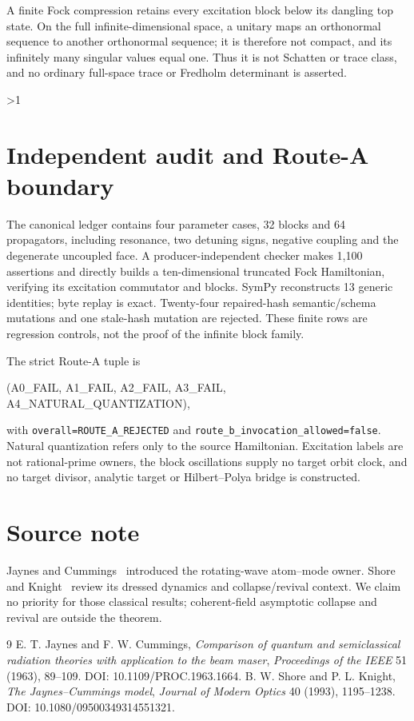 \documentclass[11pt]{article}
\begin{document}
A finite Fock compression retains every excitation block below its dangling
top state.  On the full infinite-dimensional space, a unitary maps an
orthonormal sequence to another orthonormal sequence; it is therefore not
compact, and its infinitely many singular values equal one.  Thus it is not
Schatten or trace class, and no ordinary full-space trace or Fredholm
determinant is asserted.
\fi

\ifnum\CRevisionRound>1
\section{Independent audit and Route-A boundary}
The canonical ledger contains four parameter cases, 32 blocks and 64
propagators, including resonance, two detuning signs, negative coupling and
the degenerate uncoupled face.  A producer-independent checker makes 1,100
assertions and directly builds a ten-dimensional truncated Fock Hamiltonian,
verifying its excitation commutator and blocks.  SymPy reconstructs 13 generic
identities; byte replay is exact.  Twenty-four repaired-hash semantic/schema
mutations and one stale-hash mutation are rejected.  These finite rows are
regression controls, not the proof of the infinite block family.

The strict Route-A tuple is
\begin{center}\ttfamily
(A0\_FAIL, A1\_FAIL, A2\_FAIL, A3\_FAIL,
A4\_NATURAL\_QUANTIZATION),
\end{center}
with \texttt{overall=ROUTE\_A\_REJECTED} and
\texttt{route\_b\_invocation\_allowed=false}.  Natural quantization refers
only to the source Hamiltonian.  Excitation labels are not rational-prime
owners, the block oscillations supply no target orbit clock, and no target
divisor, analytic target or Hilbert--Polya bridge is constructed.
\fi

\section*{Source note}
Jaynes and Cummings~\cite{jc1963} introduced the rotating-wave atom--mode
owner.  Shore and Knight~\cite{sk1993} review its dressed dynamics and
collapse/revival context.  We claim no priority for those classical results;
coherent-field asymptotic collapse and revival are outside the theorem.

\begin{thebibliography}{9}
 E. T. Jaynes and F. W. Cummings, \textit{Comparison of
quantum and semiclassical radiation theories with application to the beam
maser}, \emph{Proceedings of the IEEE} 51 (1963), 89--109.
DOI: 10.1109/PROC.1963.1664.
 B. W. Shore and P. L. Knight, \textit{The Jaynes--Cummings
model}, \emph{Journal of Modern Optics} 40 (1993), 1195--1238.
DOI: 10.1080/09500349314551321.
\end{thebibliography}
\end{document}
